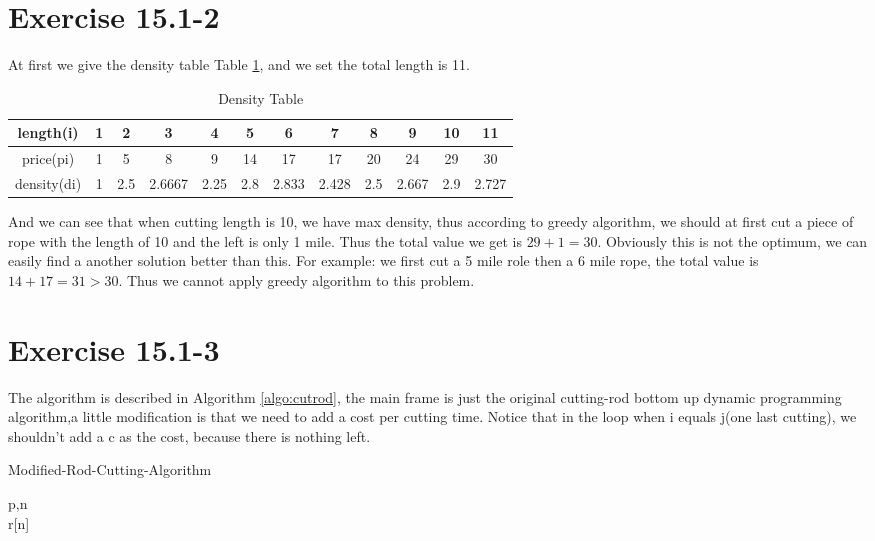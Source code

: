 \documentclass[oneside]{homework} %
\begin{document}
\maketitle
\newpage
\section*{Exercise 15.1-2}
At first we give the density table Table \ref{tab:dtable},  and we set the total length is 11.
\begin{table}[h]
  \centering
  \begin{tabular}{|c|c|c|c|c|c|c|c|c|c|c|c|}
	\hline
	length(i) &  1&2&3&4& 5& 6& 7& 8& 9& 10 & 11 \\
	\hline
	price(pi)& 1&5&8&9&14&17&17&20&24&29&30  \\
	\hline
	density(di)& 1&	2.5& 2.6667& 2.25& 2.8&	2.833& 2.428& 2.5& 2.667& 2.9 & 2.727 \\
	\hline
  \end{tabular}
  \caption{Density Table}
  \label{tab:dtable}
\end{table}
And we can see that when cutting length is 10, we have max density, thus according to greedy algorithm, we should at first cut a piece of rope with the length of 10 and the left is only 1 mile. Thus the total value we get is $29+1 = 30$.
Obviously this is not the optimum, we can easily find a another solution better than this.
For example: we first cut a 5 mile role then a 6 mile rope, the total value is $14+17=31 > 30$.
Thus we cannot apply greedy algorithm to this problem.
\section*{Exercise 15.1-3}
The algorithm is described in Algorithm \ref{algo:cutrod}, the main frame is just the original cutting-rod bottom up dynamic programming algorithm,a little modification is that we need to add a cost per cutting time. Notice that in the loop when i equals j(one last cutting), we shouldn't add a c as the cost, because there is nothing left. 
  \begin{algorithm}[h]
	\caption{Modified-Rod-Cutting-Algorithm}
	\label{algo:cutrod}
	\begin{algorithmic}[1]
	  \REQUIRE p,n
	  \ENSURE ~ ~\\ 
		  \ELSE 
		  \ENDIF
		\ENDFOR
	  \ENDFOR
	  \LASTCON r[n]	
	\end{algorithmic}
  \end{algorithm}
\end{document}

